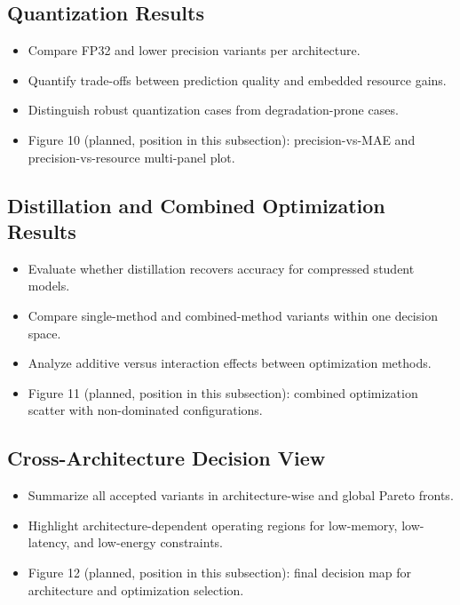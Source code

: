 ﻿\documentclass[review]{elsarticle}
\begin{document}
\subsection{Quantization Results}
\begin{itemize}[leftmargin=*]
\item Compare FP32 and lower precision variants per architecture.
\item Quantify trade-offs between prediction quality and embedded resource gains.
\item Distinguish robust quantization cases from degradation-prone cases.
\item Figure 10 (planned, position in this subsection): precision-vs-MAE and precision-vs-resource multi-panel plot.
\end{itemize}

\subsection{Distillation and Combined Optimization Results}
\begin{itemize}[leftmargin=*]
\item Evaluate whether distillation recovers accuracy for compressed student models.
\item Compare single-method and combined-method variants within one decision space.
\item Analyze additive versus interaction effects between optimization methods.
\item Figure 11 (planned, position in this subsection): combined optimization scatter with non-dominated configurations.
\end{itemize}

\subsection{Cross-Architecture Decision View}
\begin{itemize}[leftmargin=*]
\item Summarize all accepted variants in architecture-wise and global Pareto fronts.
\item Highlight architecture-dependent operating regions for low-memory, low-latency, and low-energy constraints.
\item Figure 12 (planned, position in this subsection): final decision map for architecture and optimization selection.
\end{itemize}
\end{document}
